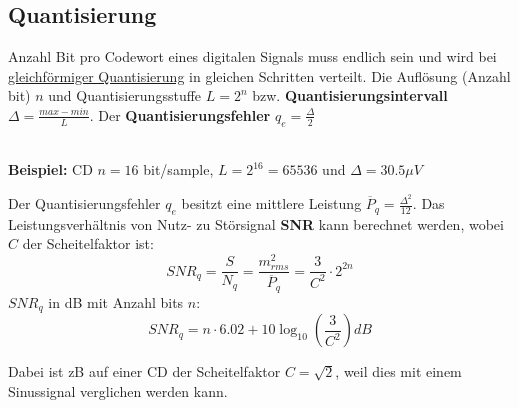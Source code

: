 \subsection{Quantisierung}
Anzahl Bit pro Codewort eines digitalen Signals muss endlich sein und wird bei \underline{gleichförmiger Quantisierung} in gleichen Schritten verteilt. Die Auflösung (Anzahl bit) $n$ und Quantisierungsstuffe $L =2^n$ bzw. \textbf{Quantisierungsintervall} $\Delta = \frac{max - min}{L}$. Der \textbf{Quantisierungsfehler} $q_{e} = \frac{\Delta}{2}$

~\\
\noindent\textbf{Beispiel:} CD
$n = 16$ bit/sample, $L=2^{16} = 65536$ und $\Delta = 30.5\mu V$

Der Quantisierungsfehler $q_e$ besitzt eine mittlere Leistung $\overline{P}_q = \frac{\Delta^2}{12}$. Das Leistungsverhältnis von Nutz- zu Störsignal \textbf{SNR} kann berechnet werden, wobei $C$ der Scheitelfaktor ist:
\[
SNR_q = \frac{S}{N_q} = \frac{m_{rms}^2}{\overline{P}_q} = \frac{3}{C^2}\cdot2^{2n}
\]
$SNR_q$ in dB mit Anzahl bits $n$:
\[
SNR_q = n\cdot 6.02 + 10\log_{10}\left(\frac{3}{C^2}\right)dB
\]

Dabei ist zB auf einer CD der Scheitelfaktor $C = \sqrt{2}$, weil dies mit einem Sinussignal verglichen werden kann. 
